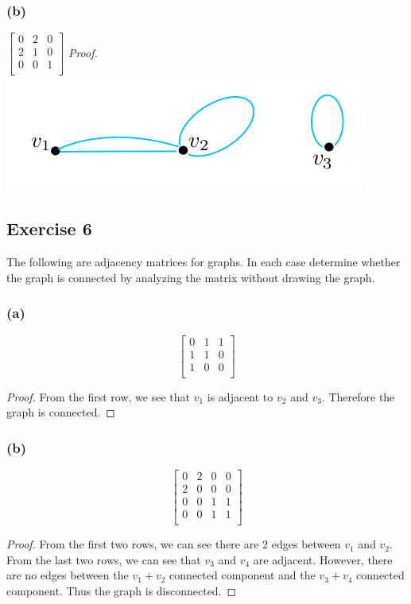 \documentclass[14pt]{extarticle}
\begin{document}
\subsubsection{(b)}
\(
\left[
    \begin{array}{ccc}
        0 & 2 & 0 \\
        2 & 1 & 0 \\
        0 & 0 & 1 \\
    \end{array}
    \right]
\)
{\it Proof.} \includegraphics[scale=0.6]{../images/10.2.5.b.png}

\subsection{Exercise 6}
The following are adjacency matrices for graphs. In each case determine whether the graph is connected by analyzing the
matrix without drawing the graph.

\subsubsection{(a)}
\[
    \left[
        \begin{array}{ccc}
            0 & 1 & 1 \\
            1 & 1 & 0 \\
            1 & 0 & 0 \\
        \end{array}
        \right]
\]
\begin{proof}
    From the first row, we see that \(v_1\) is adjacent to \(v_2\) and \(v_3\). Therefore the graph is connected.
\end{proof}

\subsubsection{(b)}
\[
    \left[
        \begin{array}{cccc}
            0 & 2 & 0 & 0 \\
            2 & 0 & 0 & 0 \\
            0 & 0 & 1 & 1 \\
            0 & 0 & 1 & 1 \\
        \end{array}
        \right]
\]
\begin{proof}
    From the first two rows, we can see there are 2 edges between \(v_1\) and \(v_2\). From the last two rows, we can see that
    \(v_3\) and \(v_4\) are adjacent. However, there are no edges between the \(v_1+v_2\) connected component and the
    \(v_3+v_4\) connected component. Thus the graph is disconnected.
\end{proof}
\end{document}
